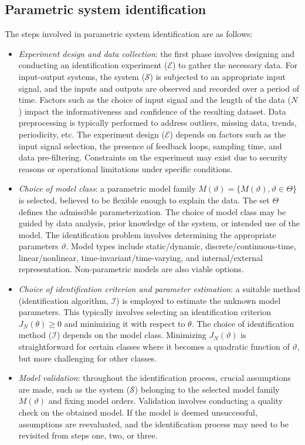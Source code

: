 \subsection{Parametric system identification}
The steps involved in parametric system identification are as follows:
\begin{itemize}
    \item \textit{Experiment design and data collection}: the first phase involves designing and conducting an identification experiment ($\mathcal{E}$) to gather the necessary data. 
        For input-output systems, the system ($\mathcal{S}$) is subjected to an appropriate input signal, and the inputs and outputs are observed and recorded over a period of time. 
        Factors such as the choice of input signal and the length of the data ($N$) impact the informativeness and confidence of the resulting dataset. 
        Data preprocessing is typically performed to address outliers, missing data, trends, periodicity, etc. 
        The experiment design ($\mathcal{E}$) depends on factors such as the input signal selection, the presence of feedback loops, sampling time, and data pre-filtering. 
        Constraints on the experiment may exist due to security reasons or operational limitations under specific conditions.
    \item \textit{Choice of model class}: a parametric model family $M(\vartheta) = \{M(\vartheta), \vartheta \in \Theta\}$ is selected, believed to be flexible enough to explain the data. 
        The set $\Theta$ defines the admissible parameterization. 
        The choice of model class may be guided by data analysis, prior knowledge of the system, or intended use of the model. 
        The identification problem involves determining the appropriate parameters $\vartheta$. 
        Model types include static/dynamic, discrete/continuous-time, linear/nonlinear, time-invariant/time-varying, and internal/external representation. 
        Non-parametric models are also viable options.
    \item \textit{Choice of identification criterion and parameter estimation}: a suitable method (identification algorithm, $\mathcal{I}$) is employed to estimate the unknown model parameters. 
        This typically involves selecting an identification criterion \(J_N(\theta) \geq 0\) and minimizing it with respect to \(\theta\). 
        The choice of identification method ($\mathcal{I}$) depends on the model class. 
        Minimizing $J_N(\vartheta)$ is straightforward for certain classes where it becomes a quadratic function of $\vartheta$, but more challenging for other classes.
    \item \textit{Model validation}: throughout the identification process, crucial assumptions are made, such as the system ($\mathcal{S}$) belonging to the selected model family $M(\vartheta)$ and fixing model orders. 
        Validation involves conducting a quality check on the obtained model. 
        If the model is deemed unsuccessful, assumptions are reevaluated, and the identification process may need to be revisited from steps one, two, or three.
\end{itemize}